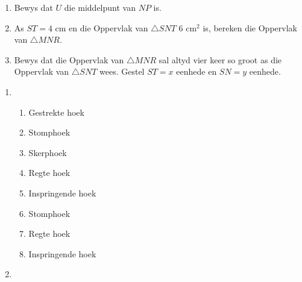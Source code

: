 \begin{eocexercises}{}
\begin{enumerate}[itemsep=20pt, label=\textbf{\arabic*}.]
\begin{center}
{}
\end{center}
\begin{enumerate}[noitemsep, label=\textbf{(\alph*)} ]
\item Bewys dat $U$ die middelpunt van $NP$ is.
\item As $ST=4$ cm en die Oppervlak van $\triangle SNT$ $6$ cm$^2$ is, bereken die Oppervlak van $\triangle MNR$.
\item Bewys dat die Oppervlak van $\triangle MNR$ sal altyd vier keer so groot as die Oppervlak van $\triangle SNT$ wees. Gestel $ST=x$ eenhede en $SN=y$ eenhede.
\end{enumerate}
\end{enumerate}

\end{eocexercises}


 \begin{eocsolutions}{}{
\begin{enumerate}[itemsep=5pt, label=\textbf{\arabic*}. ] 


\item %
	  \begin{enumerate}[noitemsep, label=\textbf{(\alph*)} ]
		\item Gestrekte hoek
\item Stomphoek
\item Skerphoek
\item Regte hoek
\item Inspringende hoek
\item Stomphoek
\item Regte hoek
\item Inspringende hoek
	  \end{enumerate}
\item %
      \begin{enumerate}[noitemsep, label=\textbf{(\alph*)} ]


\end{enumerate}
\end{enumerate}}
\end{eocsolutions}
